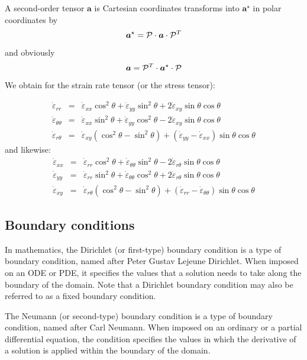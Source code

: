 A second-order tensor ${\bm a}$ is Cartesian coordinates transforms into ${\bm a}^\star$
in polar coordinates by 
\[
{\bm a}^\star = {\cal P} \cdot {\bm a} \cdot {\cal P}^T
\]
and obviously 
\[
{\bm a} = {\cal P}^T \cdot {\bm a}^\star \cdot {\cal P}
\]
We obtain for the strain rate tensor (or the stress tensor):

\begin{eqnarray}
\dot{\varepsilon}_{rr} 
&=& \dot{\varepsilon}_{xx} \cos^2\theta + \dot{\varepsilon}_{yy} \sin^2\theta 
+ 2 \dot{\varepsilon}_{xy} \sin\theta\cos\theta \\
\dot{\varepsilon}_{\theta\theta}
&=& \dot{\varepsilon}_{xx} \sin^2\theta + \dot{\varepsilon}_{yy} \cos^2\theta 
- 2 \dot{\varepsilon}_{xy} \sin\theta\cos\theta \\
\dot{\varepsilon}_{r\theta} 
&=& \dot{\varepsilon}_{xy} (\cos^2\theta-\sin^2\theta) + 
(\dot{\varepsilon}_{yy} - \dot{\varepsilon}_{xx})\sin\theta \cos\theta
\end{eqnarray}
and likewise:
\begin{eqnarray}
\dot{\varepsilon}_{xx} 
&=& \dot{\varepsilon}_{rr} \cos^2\theta + \dot{\varepsilon}_{\theta\theta} \sin^2\theta - 2 \dot{\varepsilon}_{r\theta} \sin\theta\cos\theta \\
\dot{\varepsilon}_{yy}
&=& \dot{\varepsilon}_{rr} \sin^2\theta + \dot{\varepsilon}_{\theta\theta} \cos^2\theta + 2 \dot{\varepsilon}_{r\theta} \sin\theta\cos\theta \\
\dot{\varepsilon}_{xy} 
&=& \dot{\varepsilon}_{r\theta} (\cos^2\theta-\sin^2\theta) + 
(\dot{\varepsilon}_{rr} - \dot{\varepsilon}_{\theta\theta})\sin\theta \cos\theta \label{ss:srboth}
\end{eqnarray}



\newpage
\subsection{Boundary conditions}

In mathematics, the Dirichlet (or first-type) 
boundary condition is a type of boundary condition, named after Peter Gustav Lejeune Dirichlet.
When imposed on an ODE or PDE, it specifies the values that a solution needs 
to take along the boundary of the domain.
Note that a Dirichlet boundary condition may also be referred to as a fixed boundary condition. 

The Neumann (or second-type) boundary condition is a type of boundary condition, 
named after Carl Neumann. When imposed on an ordinary or a partial differential equation, 
the condition specifies the values in which the derivative of a solution is 
applied within the boundary of the domain.

